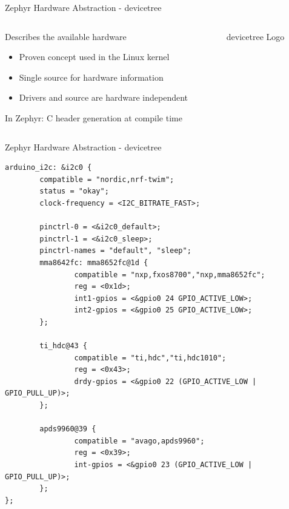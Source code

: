 \documentclass[10pt, aspectratio=169]{beamer}
\begin{document}
\begin{frame}[fragile]{Zephyr Hardware Abstraction - devicetree}
  \begin{columns}
    \begin{column}{0.6\textwidth}
      Describes the available hardware
        \begin{itemize}
          \item Proven concept used in the Linux kernel
          \item Single source for hardware information
          \item Drivers and source are hardware independent
        \end{itemize}

      In Zephyr: C header generation at compile time
    \end{column}
    \begin{column}{0.4\textwidth}
      \begin{figure}
        \hspace*{-0.5cm}
        
              \caption*{devicetree Logo\footnotemark}
      \end{figure}
    \end{column}
  \end{columns}
\end{frame}
\begin{frame}[fragile]{Zephyr Hardware Abstraction - devicetree}
  \begin{listing}[H]
    \begin{verbatim}
arduino_i2c: &i2c0 {
        compatible = "nordic,nrf-twim";
        status = "okay";
        clock-frequency = <I2C_BITRATE_FAST>;

        pinctrl-0 = <&i2c0_default>;
        pinctrl-1 = <&i2c0_sleep>;
        pinctrl-names = "default", "sleep";
        mma8642fc: mma8652fc@1d {
                compatible = "nxp,fxos8700","nxp,mma8652fc";
                reg = <0x1d>;
                int1-gpios = <&gpio0 24 GPIO_ACTIVE_LOW>;
                int2-gpios = <&gpio0 25 GPIO_ACTIVE_LOW>;
        };

        ti_hdc@43 {
                compatible = "ti,hdc","ti,hdc1010";
                reg = <0x43>;
                drdy-gpios = <&gpio0 22 (GPIO_ACTIVE_LOW | GPIO_PULL_UP)>;
        };

        apds9960@39 {
                compatible = "avago,apds9960";
                reg = <0x39>;
                int-gpios = <&gpio0 23 (GPIO_ACTIVE_LOW | GPIO_PULL_UP)>;
        };
};
    \end{verbatim}
          \caption{\scriptsize{devicetree node for the reel board: \texttt{boards/phytec/reel\_board/dts/reel\_board.dtsi}}}
  \end{listing}
\end{frame}
\end{document}
